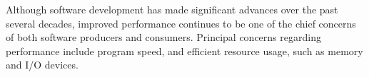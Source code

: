 Although software development has made significant advances over the past several decades, improved performance continues to be one of the chief concerns of both software producers and consumers. Principal concerns regarding performance include program speed, and efficient resource usage, such as memory and I/O devices.
